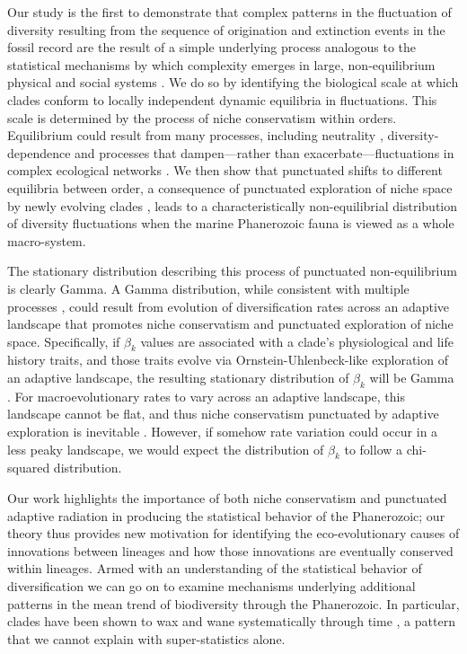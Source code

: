 \documentclass[12pt]{article}
\let\citep=\cite
\begin{document}
Our study is the first to demonstrate that complex patterns in the
fluctuation of diversity resulting from the sequence of origination
and extinction events in the fossil record are the result of a simple
underlying process analogous to the statistical mechanisms by which
complexity emerges in large, non-equilibrium physical \citep{beck2004}
and social systems \citep{fuentes2009}.  We do so by identifying the
biological scale at which clades conform to locally independent
dynamic equilibria in fluctuations. This scale is determined by the
process of niche conservatism \citep{roy2009range, hopkins2014} within
orders.  Equilibrium could result from many processes, including
neutrality \citep{macWilson, hubbell2001}, diversity-dependence
\citep{gavrilets2005, rabosky2009ecolLett} and processes that
dampen---rather than exacerbate---fluctuations in complex ecological
networks \citep{berlow2009}. We then show that punctuated shifts to
different equilibria between order, a consequence of punctuated
exploration of niche space by newly evolving clades
\citep{eldredgeGould1972, newman1985adaptive, hopkins2014}, leads to a
characteristically non-equilibrial distribution of diversity
fluctuations when the marine Phanerozoic fauna is viewed as a whole
macro-system.

The stationary distribution describing this process of punctuated
non-equilibrium is clearly Gamma.  A Gamma distribution, while
consistent with multiple processes \citep[e.g.][]{cir1985}, could
result from evolution of diversification rates across an adaptive
landscape that promotes niche conservatism and punctuated exploration
of niche space.  Specifically, if $\beta_k$ values are associated with
a clade's physiological and life history traits, and those traits
evolve via Ornstein-Uhlenbeck-like exploration of an adaptive
landscape, the resulting stationary distribution of $\beta_k$ will be
Gamma \citep{cir1985, butler2004}.  For macroevolutionary rates to
vary across an adaptive landscape, this landscape cannot be flat, and
thus niche conservatism punctuated by adaptive exploration is
inevitable \citep{newman1985adaptive}. However, if somehow rate
variation could occur in a less peaky landscape, we would expect the
distribution of $\beta_k$ to follow a chi-squared distribution.

Our work highlights the importance of both niche conservatism and
punctuated adaptive radiation in producing the statistical behavior of
the Phanerozoic; our theory thus provides new motivation for
identifying the eco-evolutionary causes of innovations between
lineages and how those innovations are eventually conserved within
lineages. Armed with an understanding of the statistical behavior of
diversification we can go on to examine mechanisms underlying
additional patterns in the mean trend of biodiversity through the
Phanerozoic. In particular, clades have been shown to wax and wane
systematically through time \citep{liow2007,
  quental2013}, a pattern that we cannot explain with super-statistics
alone.
\end{document}
